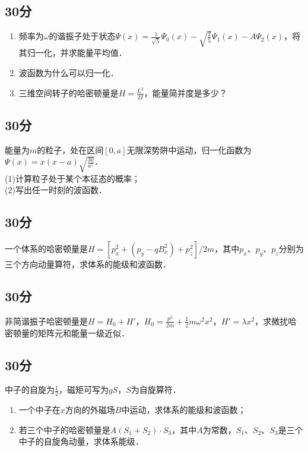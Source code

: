 
\subsection{30分}
\begin{enumerate}
\item 频率为$\omega$的谐振子处于状态$\varPsi (x)=\frac{1}{\sqrt{5}}\varPsi_{0} (x)-\sqrt{\frac{2}{5}}\varPsi_{1} (x)-A\varPsi_2 (x)$，将其归一化，并求能量平均值．
\item 波函数为什么可以归一化．
\item 三维空间转子的哈密顿量是$H=\frac{L^{2}}{2I}$，能量简并度是多少？
\end{enumerate}
\subsection{30分}
能量为$m$的粒子，处在区间$[0,a]$无限深势阱中运动，归一化函数为$\varPsi (x)=x(x-a)\sqrt{\frac{30}{a^{5}}}$．\\
(1)计算粒子处于某个本征态的概率；\\
(2)写出任一时刻的波函数．
\subsection{30分}
一个体系的哈密顿量是$H=[p^{2}_{x}+(p_{y}-qB_{x}^{2})+p^{2}_{z}]/2m$，其中$p_{x}$、$p_{y}$、$p_{z}$分别为三个方向动量算符，求体系的能级和波函数．
\subsection{30分}
非简谐振子哈密顿量是$H=H_{0}+H'$，$H_{0}=\frac{p^{2}}{2m}+\frac{1}{2}m\omega^{2}x^{2}$，$H'=\lambda x^{2}$，求微扰哈密顿量的矩阵元和能量一级近似．
\subsection{30分}
中子的自旋为$\frac{1}{2}$，磁矩可写为$gS$，$S$为自旋算符．
\begin{enumerate}
\item 一个中子在$x$方向的外磁场$B$中运动，求体系的能级和波函数；
\item 若三个中子的哈密顿量是$A(S_{1}+S_{2})\cdot S_{3}$，其中$A$为常数，$S_{1}$、$S_{2}$、$S_{3}$是三个中子的自旋角动量，求体系能级．
\end{enumerate}